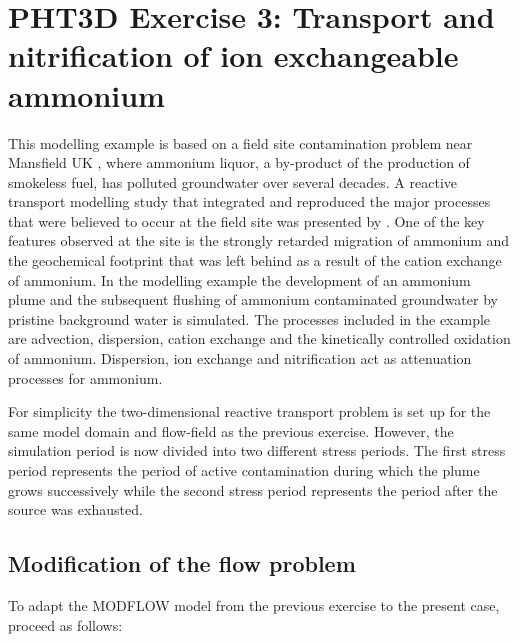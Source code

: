 \newpage
\section[PHT3D Exercise 3: Transport and nitrification of ion exchangeable ammonium]{PHT3D Exercise 3: Transport and nitrification of ion exchangeable ammonium}

This modelling example is based on a field site contamination problem near
Mansfield UK \citep[see, e.g.,][]{broholm98, phddavison,jones1998, davison2000,
jones2001}, where ammonium liquor, a by-product of the production
of smokeless fuel, has polluted groundwater over several decades.
A reactive transport modelling study that integrated 
and reproduced the major processes that were believed to occur at the
field site was presented by \cite{haerens_phd}. 
One of the key features observed at the site is the
strongly retarded migration of ammonium and the geochemical footprint that
was left behind as a result of the cation exchange of ammonium.  
In the modelling example the development of an ammonium plume
and the subsequent flushing of ammonium contaminated groundwater by
pristine background water is simulated.  The processes included in
the example are advection, dispersion, cation exchange
and the kinetically controlled oxidation of ammonium.
Dispersion, ion exchange and nitrification act as attenuation 
processes for ammonium.

For simplicity the two-dimensional reactive transport problem is set up
for the same model domain and flow-field as the previous exercise.
However, the simulation period is now divided into two different 
stress periods. The first stress period represents the period 
of active contamination during which the plume grows successively
while the second stress period represents the period after the source 
was exhausted.

\subsection[Modification of the flow problem]{Modification of the flow problem}

To adapt the MODFLOW model from the previous exercise to the present case, proceed as follows:

